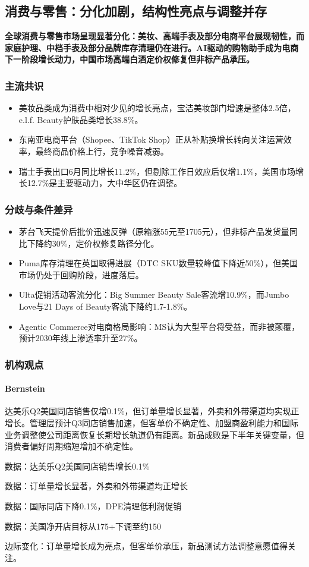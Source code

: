 \documentclass[11pt]{ctexart}
\begin{document}
\subsection{消费与零售：分化加剧，结构性亮点与调整并存}
\textbf{全球消费与零售市场呈现显著分化：美妆、高端手表及部分电商平台展现韧性，而家庭护理、中档手表及部分品牌库存清理仍在进行。AI驱动的购物助手成为电商下一阶段增长动力，中国市场高端白酒定价权修复但非标产品承压。}
\subsubsection*{主流共识}
\begin{itemize}
  \item 美妆品类成为消费中相对少见的增长亮点，宝洁美妆部门增速是整体2.5倍，e.l.f. Beauty护肤品类增长38.8\%。
  \item 东南亚电商平台（Shopee、TikTok Shop）正从补贴换增长转向关注运营效率，最终商品价格上行，竞争噪音减弱。
  \item 瑞士手表出口6月同比增长11.2\%，但剔除工作日效应后仅增1.1\%，美国市场增长12.7\%是主要驱动力，大中华区仍在调整。
\end{itemize}
\subsubsection*{分歧与条件差异}
\begin{itemize}
  \item 茅台飞天提价后批价迅速反弹（原箱涨55元至1705元），但非标产品发货量同比下降约30\%，定价权修复路径分化。
  \item Puma库存清理在英国取得进展（DTC SKU数量较峰值下降近50\%），但美国市场仍处于回购阶段，进度落后。
  \item Ulta促销活动客流分化：Big Summer Beauty Sale客流增10.9\%，而Jumbo Love与21 Days of Beauty客流下降约1.7-1.8\%。
  \item Agentic Commerce对电商格局影响：MS认为大型平台将受益，而非被颠覆，预计2030年线上渗透率升至27\%。
\end{itemize}
\subsubsection*{机构观点}
\paragraph{Bernstein} 达美乐Q2美国同店销售仅增0.1\%，但订单量增长显著，外卖和外带渠道均实现正增长。管理层预计Q3同店销售加速，但客单价不确定性、加盟商盈利能力和国际业务调整使公司距离恢复长期增长轨道仍有距离。新品成败是下半年关键变量，但消费者偏好周期缩短增加不确定性。
{\small\color{refgray}数据：达美乐Q2美国同店销售增长0.1\%\par}
{\small\color{refgray}数据：订单量增长显著，外卖和外带渠道均正增长\par}
{\small\color{refgray}数据：国际同店下降0.1\%，DPE清理低利润促销\par}
{\small\color{refgray}数据：美国净开店目标从175+下调至约150\par}
{\small\color{refgray}边际变化：订单量增长成为亮点，但客单价承压，新品测试方法调整意愿值得关注。\par}
\end{document}
